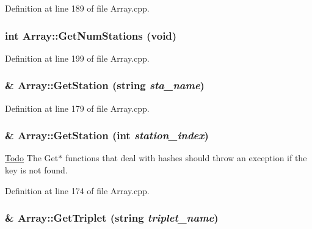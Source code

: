 Definition at line 189 of file Array.cpp.

\hypertarget{classArray_a1c745caf02f1a9177f870c493561d891}{
\subsubsection[{GetNumStations}]{\setlength{\rightskip}{0pt plus 5cm}int Array::GetNumStations (void)}}
\label{classArray_a1c745caf02f1a9177f870c493561d891}


Definition at line 199 of file Array.cpp.

\hypertarget{classArray_a1de46f9a81f795470a6436a59e76f088}{
\subsubsection[{GetStation}]{ \& Array::GetStation (string {\em sta\_\-name})}}
\label{classArray_a1de46f9a81f795470a6436a59e76f088}


Definition at line 179 of file Array.cpp.

\hypertarget{classArray_acb9ecf27c0fe2ad73e15c34f80d90c5c}{
\subsubsection[{GetStation}]{ \& Array::GetStation (int {\em station\_\-index})}}
\label{classArray_acb9ecf27c0fe2ad73e15c34f80d90c5c}
\begin{Desc}
\item[\hyperlink{todo__todo000003}{Todo}]The Get$\ast$ functions that deal with hashes should throw an exception if the key is not found. \end{Desc}


Definition at line 174 of file Array.cpp.

\hypertarget{classArray_aef1d8f21507a32f27c80768e3a465070}{
\subsubsection[{GetTriplet}]{ \& Array::GetTriplet (string {\em triplet\_\-name})}}
\label{classArray_aef1d8f21507a32f27c80768e3a465070}


